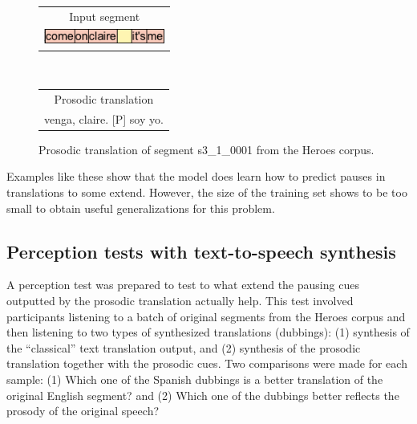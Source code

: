 \begin{figure}[h!]
\centering
\begin{minipage}[t]{0.37\textwidth}
\begin{tabular}{c}
Input segment \\
\includegraphics[height=0.5cm]{img/s3_1_0001.png} \\
\end{tabular}
\end{minipage}
\\
\begin{minipage}[t]{0.4\textwidth}
\begin{tabular}{c}
Prosodic translation \\
venga, claire. [P] soy yo. \\
\end{tabular}
\end{minipage}
\caption{Prosodic translation of segment s3\_1\_0001 from the Heroes corpus.}
\label{transprose:figure:q3:goodone2}
\end{figure}

Examples like these show that the model does learn how to predict pauses in translations to some extend. However, the size of the training set shows to be too small to obtain useful generalizations for this problem. 

\subsection*{Perception tests with text-to-speech synthesis}
A perception test was prepared to test to what extend the pausing cues outputted by the prosodic translation actually help. This test involved participants listening to a batch of original segments from the Heroes corpus and then listening to two types of synthesized translations (dubbings): (1) synthesis of the ``classical'' text translation output, and (2) synthesis of the prosodic translation together with the prosodic cues. Two comparisons were made for each sample: (1) Which one of the Spanish dubbings is a better translation of the original English segment? and (2) Which one of the dubbings better reflects the prosody of the original speech?

